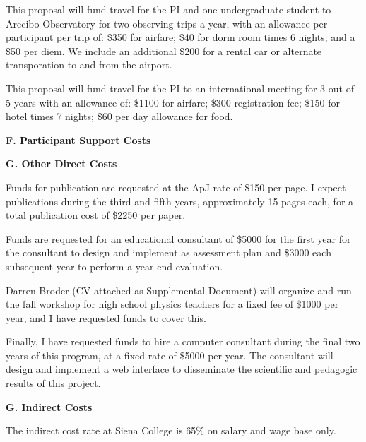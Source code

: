 \documentclass[preprint,11pt]{aastex}
\begin{document}
This proposal will fund travel for the PI and one undergraduate student 
to Arecibo Observatory for two observing trips a year, with an allowance 
per participant per trip of: \$350 for airfare;
\$40 for dorm room times 6 nights; and a \$50 per diem.
We include an additional \$200 for a rental car or 
alternate transporation to and from the airport.

This proposal will fund travel for the PI to an international 
meeting for 3 out of 5 years with an allowance of:
\$1100 for airfare; \$300 registration fee; \$150 for hotel times 7 nights;
\$60 per day allowance for food.

\begin{center}
{\bf \large F. Participant Support Costs}
\end{center}

\begin{center}
{\bf \large G. Other Direct Costs}
\end{center}



Funds for publication are requested at the ApJ rate of \$150 per page.
I expect publications during the third and fifth years, approximately 15 pages
each, for a total publication cost of \$2250 per paper.


Funds are requested for an educational consultant of  
\$5000 for the first year for the consultant to design
and implement as assessment plan and \$3000 each subsequent year to perform a 
year-end evaluation.

Darren Broder (CV attached as Supplemental 
Document) will organize and run the fall workshop for high school physics teachers
for a fixed fee of \$1000 per year, and I have requested funds to cover
this.

Finally, I have requested funds to hire a computer consultant during the 
final two years of this program, at a fixed rate of \$5000 per year.  
The consultant will design and implement
a web interface to disseminate the scientific and pedagogic results of this
project.






\begin{center}
{\bf \large G. Indirect Costs}
\end{center}

The indirect cost rate at Siena College is 65\% on salary and wage base only.
\end{document}
